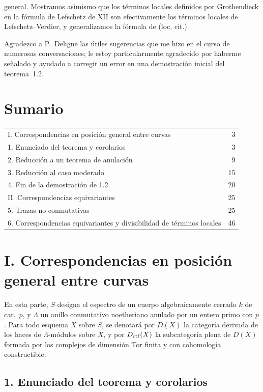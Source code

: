 general. Mostramos asimismo que los términos locales definidos por Grothendieck en la fórmula de Lefschetz de XII son efectivamente los términos locales de Lefschetz--Verdier, y generalizamos la fórmula de (loc. cit.).

Agradezco a P.~Deligne las útiles sugerencias que me hizo en el curso de numerosas conversaciones; le estoy particularmente agradecido por haberme señalado y ayudado a corregir un error en una demostración inicial del teorema~1.2.

\section*{Sumario}
\begin{tabular}{@{}p{}r@{}}
I. Correspondencias en posición general entre curvas & 3\\
1. Enunciado del teorema y corolarios & 3\\
2. Reducción a un teorema de anulación & 9\\
3. Reducción al caso moderado & 15\\
4. Fin de la demostración de 1.2 & 20\\
II. Correspondencias equivariantes & 25\\
5. Trazas no conmutativas & 25\\
6. Correspondencias equivariantes y divisibilidad de términos locales & 46
\end{tabular}

\section*{I. Correspondencias en posición general entre curvas}

En esta parte, $S$ designa el espectro de un cuerpo algebraicamente cerrado $k$ de car.~$p$, y $\Lambda$ un anillo conmutativo noetheriano anulado por un entero primo con $p$. Para todo esquema $X$ sobre $S$, se denotará por $D(X)$ la categoría derivada de los haces de $\Lambda$-módulos sobre $X$, y por $D_{\mathrm{ctf}}(X)$ la subcategoría plena de $D(X)$ formada por los complejos de dimensión Tor finita y con cohomología constructible.

\subsection*{1. Enunciado del teorema y corolarios}
